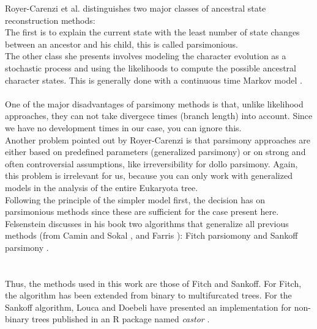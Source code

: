       Royer-Carenzi et al. distinguishes two major classes of ancestral state reconstruction methods: \\
      The first is to explain the current state with the least number of state changes between an 
        ancestor and his child, this is called parsimonious. \\
      The other class she presents involves modeling the character evolution as a stochastic process and 
        using the likelihoods to compute the possible ancestral character states. This is generally done 
        with a continuous time Markov model \cite{RoyerCarenzi2013}. \\

       \\

      One of the major disadvantages of parsimony methods is that, unlike likelihood approaches, they 
        can not take divergece times (branch length) into account. Since we have no development times in 
        our case, you can ignore this. \\
      Another problem pointed out by Royer-Carenzi is that parsimony approaches are either based on 
        predefined parameters (generalized parsimony) or on strong and often controversial assumptions, 
        like irreversibility for dollo parsimony. Again, this problem is irrelevant for us, because you 
        can only work with generalized models in the analysis of the entire Eukaryota tree. \\

      Following the principle of the simpler model first, the decision has  on parsimonious 
        methods since these are sufficient for the case present here. \\
      Felsenstein \cite{Felsenstein2003} discusses in his book two algorithms that generalize all 
        previous methods (from Camin and Sokal \cite{Camin1965},  and Farris 
        \cite{Farris1970}): Fitch parsiomony \cite{Fitch1971} and Sankoff parsimony \cite{Sankoff1975}. \\
       \\
       \\
      
      Thus, the methods used in this work are those of Fitch and Sankoff. For Fitch, the algorithm has 
        been extended from binary to multifurcated trees. For the Sankoff algorithm, Louca and Doebeli 
        have presented an implementation for non-binary trees published in an R package named 
        \textit{castor} \cite{Louca2017}.

